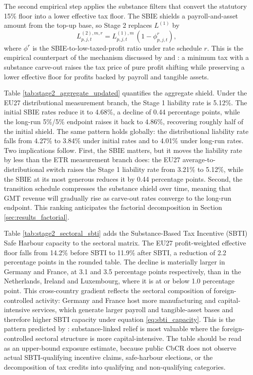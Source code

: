 \documentclass[11pt,a4paper]{article}
\begin{document}
The second empirical step applies the substance filters that convert the statutory 15\% floor into a lower effective tax floor. The SBIE shields a payroll-and-asset amount from the top-up base, so Stage 2 replaces $L^{(1)}$ by
\begin{equation}\label{eq:results_stage2_liability}
L_{p,j,t}^{(2),m,r}
= L_{p,j,t}^{(1),m}\,(1-\phi_{p,j,t}^{r}),
\end{equation}
where $\phi^{r}$ is the SBIE-to-low-taxed-profit ratio under rate schedule $r$. This is the empirical counterpart of the mechanism discussed by \citet{devereux2023} and \citet{schjelderup2024}: a minimum tax with a substance carve-out raises the tax price of pure profit shifting while preserving a lower effective floor for profits backed by payroll and tangible assets.



Table \ref{tab:stage2_aggregate_updated} quantifies the aggregate shield. Under the EU27 distributional measurement branch, the Stage 1 liability rate is 5.12\%. The initial SBIE rates reduce it to 4.68\%, a decline of 0.44 percentage points, while the long-run 5\%/5\% endpoint raises it back to 4.86\%, recovering roughly half of the initial shield. The same pattern holds globally: the distributional liability rate falls from 4.27\% to 3.84\% under initial rates and to 4.01\% under long-run rates. Two implications follow. First, the SBIE matters, but it moves the liability rate by less than the ETR measurement branch does: the EU27 average-to-distributional switch raises the Stage 1 liability rate from 3.21\% to 5.12\%, while the SBIE at its most generous reduces it by 0.44 percentage points. Second, the transition schedule compresses the substance shield over time, meaning that GMT revenue will gradually rise as carve-out rates converge to the long-run endpoint. This ranking anticipates the factorial decomposition in Section \ref{sec:results_factorial}.



Table \ref{tab:stage2_sectoral_sbti} adds the Substance-Based Tax Incentive (SBTI) Safe Harbour capacity to the sectoral matrix. The EU27 profit-weighted effective floor falls from 14.2\% before SBTI to 11.9\% after SBTI, a reduction of 2.2 percentage points in the rounded table. The decline is materially larger in Germany and France, at 3.1 and 3.5 percentage points respectively, than in the Netherlands, Ireland and Luxembourg, where it is at or below 1.0 percentage point. This cross-country gradient reflects the sectoral composition of foreign-controlled activity: Germany and France host more manufacturing and capital-intensive services, which generate larger payroll and tangible-asset bases and therefore higher SBTI capacity under equation \eqref{eq:sbti_capacity}. This is the pattern predicted by \citet{schjelderup2024}: substance-linked relief is most valuable where the foreign-controlled sectoral structure is more capital-intensive. The table should be read as an upper-bound exposure estimate, because public CbCR does not observe actual SBTI-qualifying incentive claims, safe-harbour elections, or the decomposition of tax credits into qualifying and non-qualifying categories.
\end{document}
